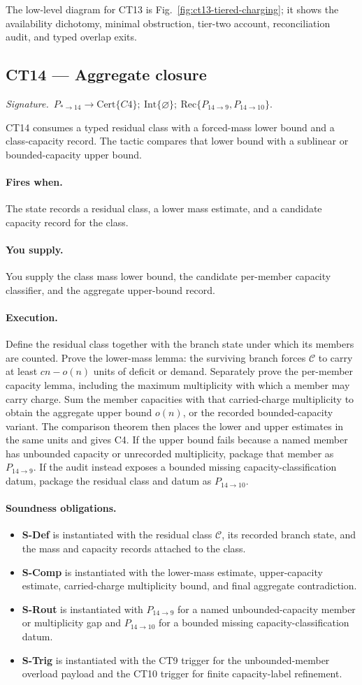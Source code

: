 \documentclass[
  11pt,
]{article}
\providecommand{\tightlist}{%
  \setlength{\itemsep}{0pt}\setlength{\parskip}{0pt}}
\theoremstyle{definition}
\newcommand{\ctsignature}[1]{\par\noindent\emph{Signature.}\ #1\par\medskip}
\newcommand{\ctcert}[1]{\mathrm{Cert}\{#1\}}
\newcommand{\ctint}[1]{\mathrm{Int}\{#1\}}
\newcommand{\ctrec}[1]{\mathrm{Rec}\{#1\}}
\newcommand{\ctnone}{\varnothing}
\newcommand{\ctpar}[1]{\paragraph{#1.}}
\begin{document}
The low-level diagram for CT13 is Fig.~\ref{fig:ct13-tiered-charging};
it shows the availability dichotomy, minimal obstruction, tier-two
account, reconciliation audit, and typed overlap exits.



\subsection{CT14 --- Aggregate closure}\label{ct:14}\label{aggregate-closure-mass-bounds-on-residual-classes}
\ctsignature{\(P_{\ast\to14}\to \ctcert{C4};\ \ctint{\ctnone};\ \ctrec{P_{14\to9},P_{14\to10}}\).}

CT14 consumes a typed residual class with a forced-mass lower bound and a
class-capacity record.  The tactic compares that lower bound with a
sublinear or bounded-capacity upper bound.

\ctpar{Fires when}
The state records a residual class, a lower mass estimate, and a
candidate capacity record for the class.

\ctpar{You supply}
You supply the class mass lower bound, the candidate per-member capacity
classifier, and the aggregate upper-bound record.

\ctpar{Execution}
Define the residual class together with the branch state under which its
members are counted.  Prove the lower-mass lemma: the surviving branch
forces \(\mathcal C\) to carry at least \(cn-o(n)\) units of deficit or
demand.  Separately prove the per-member capacity lemma, including the
maximum multiplicity with which a member may carry charge.  Sum the
member capacities with that carried-charge multiplicity to obtain the
aggregate upper bound \(o(n)\), or the recorded bounded-capacity variant.
The comparison theorem then places the lower and upper estimates in the
same units and gives C4.  If the upper bound fails because a named
member has unbounded capacity or unrecorded multiplicity, package that
member as \(P_{14\to9}\).  If the audit instead exposes a bounded missing
capacity-classification datum, package the residual class and datum as
\(P_{14\to10}\).

\ctpar{Soundness obligations}
\begin{itemize}
\tightlist
\item \textbf{S-Def} is instantiated with the residual class \(\mathcal C\), its recorded branch state, and the mass and capacity records attached to the class.
\item \textbf{S-Comp} is instantiated with the lower-mass estimate, upper-capacity estimate, carried-charge multiplicity bound, and final aggregate contradiction.
\item \textbf{S-Rout} is instantiated with \(P_{14\to9}\) for a named unbounded-capacity member or multiplicity gap and \(P_{14\to10}\) for a bounded missing capacity-classification datum.
\item \textbf{S-Trig} is instantiated with the CT9 trigger for the unbounded-member overload payload and the CT10 trigger for finite capacity-label refinement.
\end{itemize}
\end{document}
